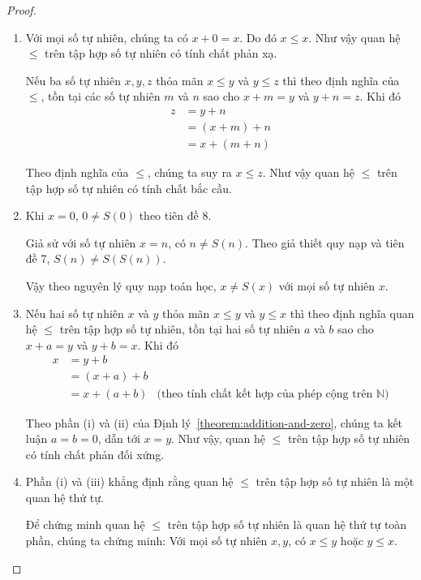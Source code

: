 \begin{proof}
	\begin{enumerate}[label={(\roman*)}]
		\item Với mọi số tự nhiên, chúng ta có $x + 0 = x$. Do đó $x\leq x$. Như vậy quan hệ $\leq$ trên tập hợp số tự nhiên có tính chất phản xạ.

		      Nếu ba số tự nhiên $x, y, z$ thỏa mãn $x\leq y$ và $y\leq z$ thì theo định nghĩa của $\leq$, tồn tại các số tự nhiên $m$ và $n$ sao cho $x + m = y$ và $y + n = z$. Khi đó
		      \begin{align*}
			      z & = y + n       \\
			        & = (x + m) + n \\
			        & = x + (m + n)
		      \end{align*}

		      Theo định nghĩa của $\leq$, chúng ta suy ra $x\leq z$. Như vậy quan hệ $\leq$ trên tập hợp số tự nhiên có tính chất bắc cầu.
		\item Khi $x = 0$, $0\ne S(0)$ theo tiên đề 8.

		      Giả sử với số tự nhiên $x = n$, có $n\ne S(n)$. Theo giả thiết quy nạp và tiên đề 7, $S(n)\ne S(S(n))$.

		      Vậy theo nguyên lý quy nạp toán học, $x\ne S(x)$ với mọi số tự nhiên $x$.
		\item Nếu hai số tự nhiên $x$ và $y$ thỏa mãn $x\leq y$ và $y\leq x$ thì theo định nghĩa quan hệ $\leq$ trên tập hợp số tự nhiên, tồn tại hai số tự nhiên $a$ và $b$ sao cho $x + a = y$ và $y + b = x$. Khi đó
		      \begin{align*}
			      x & = y + b                                                                         \\
			        & = (x + a) + b                                                                   \\
			        & = x + (a + b) & \text{(theo tính chất kết hợp của phép cộng trên $\mathbb{N}$)}
		      \end{align*}

		      Theo phần (i) và (ii) của Định lý~\ref{theorem:addition-and-zero}, chúng ta kết luận $a = b = 0$, dẫn tới $x = y$. Như vậy, quan hệ $\leq$ trên tập hợp số tự nhiên có tính chất phản đối xứng.
		\item Phần (i) và (iii) khẳng định rằng quan hệ $\leq$ trên tập hợp số tự nhiên là một quan hệ thứ tự.

		      Để chứng minh quan hệ $\leq$ trên tập hợp số tự nhiên là quan hệ thứ tự toàn phần, chúng ta chứng minh: Với mọi số tự nhiên $x, y$, có $x\leq y$ hoặc $y\leq x$.


\end{enumerate}
\end{proof}
